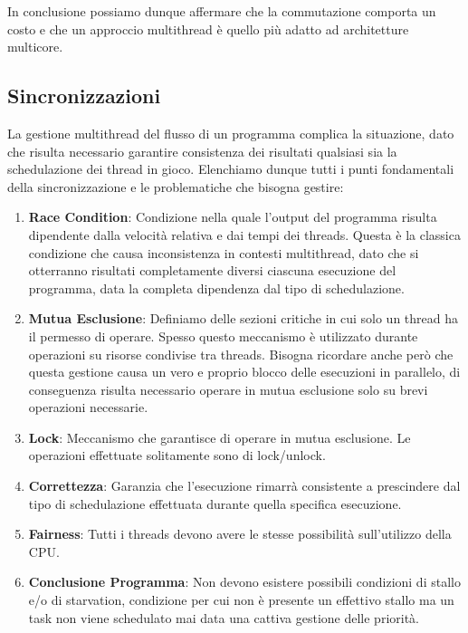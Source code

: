 \documentclass{article}
\begin{document}
In conclusione possiamo dunque affermare che la commutazione comporta un costo e che un approccio multithread è quello più adatto ad architetture multicore.

\newpage

\subsection{Sincronizzazioni}

La gestione multithread del flusso di un programma complica la situazione, dato che risulta necessario garantire consistenza dei risultati qualsiasi sia
la schedulazione dei thread in gioco. Elenchiamo dunque tutti i punti fondamentali della sincronizzazione e le problematiche che bisogna gestire:

\begin{enumerate}
    \item \textbf{Race Condition}: Condizione nella quale l'output del programma risulta dipendente dalla velocità relativa e dai tempi dei threads. Questa è la
    classica condizione che causa inconsistenza in contesti multithread, dato che si otterranno risultati completamente diversi ciascuna esecuzione del programma,
    data la completa dipendenza dal tipo di schedulazione.
    \item \textbf{Mutua Esclusione}: Definiamo delle sezioni critiche in cui solo un thread ha il permesso di operare. Spesso questo meccanismo è utilizzato
    durante operazioni su risorse condivise tra threads. Bisogna ricordare anche però che questa gestione causa un vero e proprio blocco delle esecuzioni in parallelo, 
    di conseguenza risulta necessario operare in mutua esclusione solo su brevi operazioni necessarie.
    \item \textbf{Lock}: Meccanismo che garantisce di operare in mutua esclusione. Le operazioni effettuate solitamente sono di lock/unlock.
    \item \textbf{Correttezza}: Garanzia che l'esecuzione rimarrà consistente a prescindere dal tipo di schedulazione effettuata durante quella specifica
    esecuzione.
    \item \textbf{Fairness}: Tutti i threads devono avere le stesse possibilità sull'utilizzo della CPU.
    \item \textbf{Conclusione Programma}: Non devono esistere possibili condizioni di stallo e/o di starvation, condizione per cui non è presente un
    effettivo stallo ma un task non viene schedulato mai data una cattiva gestione delle priorità.
\end{enumerate}
\end{document}
